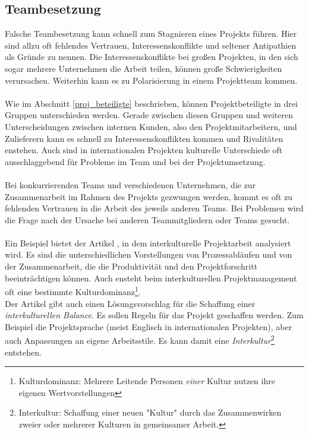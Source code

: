 \documentclass[12pt]{scrartcl}
\begin{document}
\subsection{Teambesetzung}
\label{teambesetz}
Falsche Teambesetzung kann schnell zum Stagnieren eines Projekts führen. Hier sind allzu oft fehlendes Vertrauen, Interessenskonflikte und seltener Antipathien als Gründe zu nennen. Die Interessenskonflikte bei großen Projekten, in den sich sogar mehrere Unternehmen die Arbeit teilen, können große Schwierigkeiten verursachen. Weiterhin kann es zu Polarisierung in einem Projektteam kommen.\\
\\
Wie im Abschnitt \ref{proj_beteiligte} beschrieben, können Projektbeteiligte in drei Gruppen unterschieden werden. Gerade zwischen diesen Gruppen und weiteren Unterscheidungen zwischen internen Kunden, also den Projektmitarbeitern, und Zulieferern kann es schnell zu Interessenskonflikten kommen und Rivalitäten enstehen. Auch sind in internationalen Projekten kulturelle Unterschiede oft ausschlaggebend für Probleme im Team und bei der Projektumsetzung.\\
\\
Bei konkurrierenden Teams und verschiedenen Unternehmen, die zur Zusammenarbeit im Rahmen des Projekts gezwungen werden, kommt es oft zu fehlenden Vertrauen in die Arbeit des jeweils anderen Teams. Bei Problemen wird die Frage nach der Ursache bei anderen Teammitgliedern oder Teams gesucht. \\
\\
Ein Beispiel bietet der Artikel \cite{deu_franz_pm}, in dem interkulturelle Projektarbeit analysiert wird. Es sind die unterschiedlichen Vorstellungen von Prozessabläufen und von der Zusammenarbeit, die die Produktivität und den Projektforschritt beeinträchtigen können. Auch ensteht beim interkulturellen Projektmanagement oft eine bestimmte Kulturdominanz\footnote{Kulturdominanz: Mehrere Leitende Personen \textit{einer} Kultur nutzen ihre eigenen Wertvorstellungen}.\\
Der Artikel gibt auch einen Lösungsvorschlag für die Schaffung einer \textit{interkulturellen Balance}. Es sollen Regeln für das Projekt geschaffen werden. Zum Beispiel die Projektsprache (meist Englisch in internationalen Projekten), aber auch Anpassungen an eigene Arbeitsstile. Es kann damit eine \textit{Interkultur}\footnote{Interkultur: Schaffung einer neuen "Kultur" durch das Zusammenwirken zweier oder mehrerer Kulturen in gemeinsamer Arbeit.} entstehen.
\end{document}
